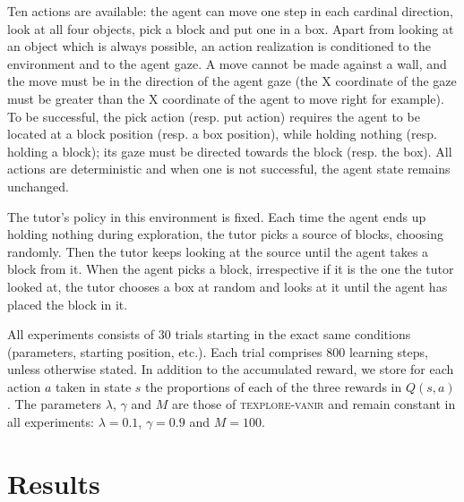 \documentclass[letterpaper, 10 pt, conference]{ieeeconf}  %
\begin{document}
Ten actions are available: the agent can move one step in each cardinal direction, look at all four objects, pick a block and put one in a box. Apart from looking at an object which is always possible, an action realization is conditioned to the environment and to the agent gaze. A move cannot be made against a wall, and the move must be in the direction of the agent gaze (the X coordinate of the gaze must be greater than the X coordinate of the agent to move right for example). To be successful, the pick action (resp. put action) requires the agent to be located at a block position (resp. a box position), while holding nothing (resp. holding a block); its gaze must be directed towards the block (resp. the box). All actions are deterministic and when one is not successful, the agent state remains unchanged.

The tutor's policy in this environment is fixed. Each time the agent ends up holding nothing during exploration, the tutor picks a source of blocks, choosing randomly. Then the tutor keeps looking at the source until the agent takes a block from it. When the agent picks a block, irrespective if it is the one the tutor looked at, the tutor chooses a box at random and looks at it until the agent has placed the block in it. 


All experiments consists of 30 trials starting in the exact same conditions (parameters, starting position, etc.). Each trial comprises 800 learning steps, unless otherwise stated. In addition to the accumulated reward, we store for each action $a$ taken in state $s$ the proportions of each of the three rewards in $Q(s,a)$. The parameters $\lambda$, $\gamma$ and $M$ are those of \textsc{texplore-vanir} and remain constant in all experiments: $\lambda = 0.1$, $\gamma = 0.9$ and $M=100$.

\section{Results}
\label{results}
\end{document}

